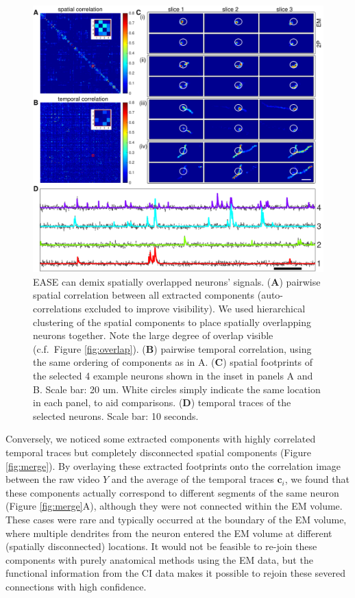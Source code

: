 \documentclass[10pt,letterpaper]{article}
\begin{document}
\begin{figure}[t!]
	\centering
	\includegraphics[width=1\textwidth]{Figs/fig_demixing_example.pdf}
	\caption{EASE can demix spatially overlapped neurons' signals. (\textbf{A}) pairwise spatial correlation between all extracted components (auto-correlations excluded to improve visibility). We used hierarchical clustering of the spatial components to place spatially overlapping neurons together.  Note the large degree of overlap visible (c.f.~Figure \ref{fig:overlap}). (\textbf{B}) pairwise temporal correlation, using the same ordering of components as in A. (\textbf{C}) spatial footprints of the selected 4 example neurons shown in the inset in panels A and B. Scale bar: 20 um.  White circles simply indicate the same location in each panel, to aid comparisons. (\textbf{D}) temporal traces of the selected neurons. Scale bar: 10 seconds. }
\label{fig:demixing}
\end{figure}


Conversely, we noticed some extracted components with highly correlated temporal traces but completely disconnected spatial components (Figure \ref{fig:merge}). By overlaying these extracted footprints onto the correlation image between the raw video $Y$ and the average of the temporal traces $\bm{c}_i$, we found that these components actually correspond to different segments of the same neuron (Figure \ref{fig:merge}A), although they were not connected within the EM volume.  These cases were rare and typically occurred at the boundary of the EM volume, where multiple dendrites from the neuron entered the EM volume at different (spatially disconnected) locations.  It would not be feasible to re-join these components with purely anatomical methods using the EM data, but the functional information from the CI data makes it possible to rejoin these severed connections with high confidence.
\end{document}
